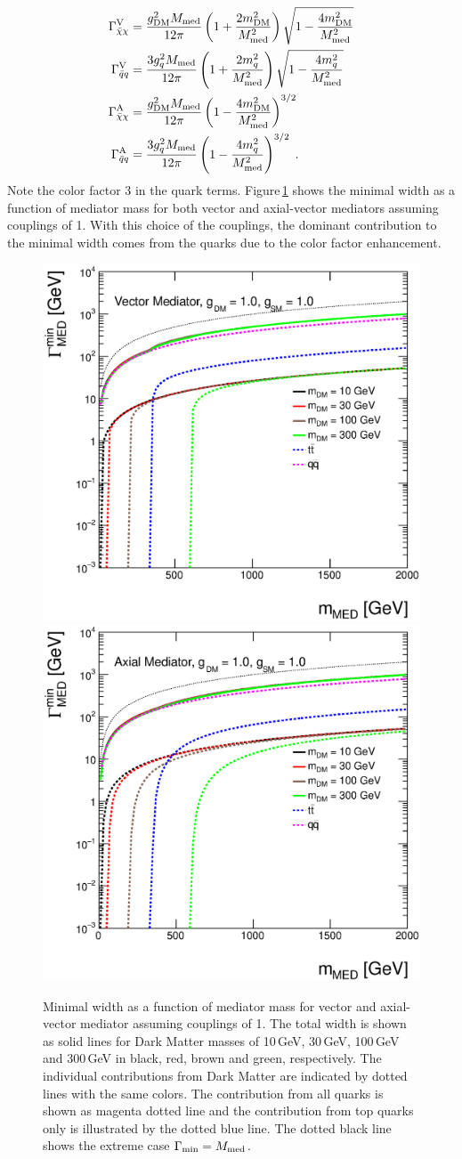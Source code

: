 \begin{align}
\Gamma_{\bar{\chi}\chi}^{\rm{V}}&=\frac{\gDM^2 \mMed}{12\pi}\left(1+\frac{2 \mDM^2}{\mMed^2} \right)\sqrt{1-\frac{4 \mDM^2}{\mMed^2}}\\
\Gamma_{\bar{q}q}^{\rm{V}}&= \frac{3 \gq^2 \mMed}{12\pi}\left(1+\frac{2 m_q^2}{\mMed^2} \right)\sqrt{1-\frac{4 m_q^2}{\mMed^2}}\\
\Gamma_{\bar{\chi}\chi}^{\rm{A}}&=\frac{\gDM^2 \mMed}{12\pi} \left(1-\frac{4 \mDM^2}{\mMed^2}\right)^{3/2}\\
\Gamma_{\bar{q}q}^{\rm{A}}&= \frac{3 \gq^2 \mMed}{12\pi}\left(1-\frac{4 m_q^2}{\mMed^2}\right)^{3/2}\label{eq:Gamma4}\;.
\end{align}
Note the color factor 3 in the quark terms.
Figure\,\ref{fig:monojet_width_V} shows the minimal width as a function of mediator mass for both vector and axial-vector mediators assuming couplings of 1. With this choice of the couplings, the dominant contribution to the minimal width comes from the quarks due to the color factor enhancement.

\begin{figure}
\centering
\includegraphics[width=0.45\linewidth]{figures/monojet/width_V.eps}
\includegraphics[width=0.45\linewidth]{figures/monojet/width_A.eps}
\caption{Minimal width as a function of mediator mass for vector and axial-vector mediator assuming couplings of 1. The total width is shown as solid lines for Dark Matter masses of 10\,GeV, 30\,GeV, 100\,GeV and 300\,GeV in black, red, brown and green, respectively. The individual contributions from Dark Matter are indicated by dotted lines with the same colors. The contribution from all quarks is shown as magenta dotted line and the contribution from top quarks only is illustrated by the dotted blue line. The dotted black line shows the extreme case $\Gamma_{\rm{min}}=M_{\rm{med}}$.}
\label{fig:monojet_width_V}
\end{figure}

